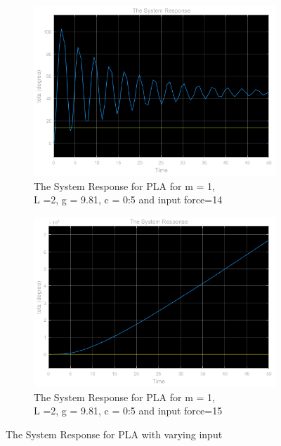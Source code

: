 \documentclass[a4paper,12pt]{article}
\begin{document}
\begin{enumerate}
\begin{enumerate}
				
				\begin{figure}[H]
					\setlength{\unitlength}{\textwidth} 
					\centering
					\begin{subfigure}{.5\textwidth}
  						\centering
  						\includegraphics[width=0.495\unitlength]{images/2d2}
  						\caption{\label{fig:2d2} The System Response for PLA for m = 1,\\L =2, g = 9.81, c = 0:5 and input force=14 }
					\end{subfigure}%
					\begin{subfigure}{.5\textwidth}
  						\centering
						\includegraphics[width=0.495\unitlength]{images/2d1}
  						\caption{\label{fig:2d1} \label{fig:2d1} The System Response for PLA for m = 1,\\L =2, g = 9.81, c = 0:5 and input force=15 }
					\end{subfigure}
					\caption{\label{fig:2d12}  The System Response for PLA with varying input   }
				\end{figure}			



		\end{enumerate}
		
		
		
		
		
		
\end{enumerate}
	
	
	
	
\end{document}
